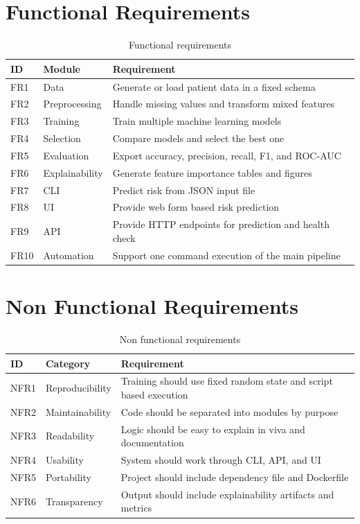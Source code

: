 \documentclass[12pt,a4paper,openany]{report}
\begin{document}
    \section{Functional Requirements}
    \begin{table}[H]
    \centering
    \caption{Functional requirements}
    \begin{tabularx}{\textwidth}{>{\raggedright\arraybackslash}p{1.6cm} >{\raggedright\arraybackslash}p{3.2cm} X}
    \toprule
    \textbf{ID} & \textbf{Module} & \textbf{Requirement} \\
    \midrule
    FR1 & Data & Generate or load patient data in a fixed schema \\
    FR2 & Preprocessing & Handle missing values and transform mixed features \\
    FR3 & Training & Train multiple machine learning models \\
    FR4 & Selection & Compare models and select the best one \\
    FR5 & Evaluation & Export accuracy, precision, recall, F1, and ROC-AUC \\
    FR6 & Explainability & Generate feature importance tables and figures \\
    FR7 & CLI & Predict risk from JSON input file \\
    FR8 & UI & Provide web form based risk prediction \\
    FR9 & API & Provide HTTP endpoints for prediction and health check \\
    FR10 & Automation & Support one command execution of the main pipeline \\
    \bottomrule
    \end{tabularx}
    \end{table}

    \section{Non Functional Requirements}
    \begin{table}[H]
    \centering
    \caption{Non functional requirements}
    \begin{tabularx}{\textwidth}{>{\raggedright\arraybackslash}p{1.6cm} >{\raggedright\arraybackslash}p{3.2cm} X}
    \toprule
    \textbf{ID} & \textbf{Category} & \textbf{Requirement} \\
    \midrule
    NFR1 & Reproducibility & Training should use fixed random state and script based execution \\
    NFR2 & Maintainability & Code should be separated into modules by purpose \\
    NFR3 & Readability & Logic should be easy to explain in viva and documentation \\
    NFR4 & Usability & System should work through CLI, API, and UI \\
    NFR5 & Portability & Project should include dependency file and Dockerfile \\
    NFR6 & Transparency & Output should include explainability artifacts and metrics \\
    \bottomrule
    \end{tabularx}
    \end{table}
\end{document}
